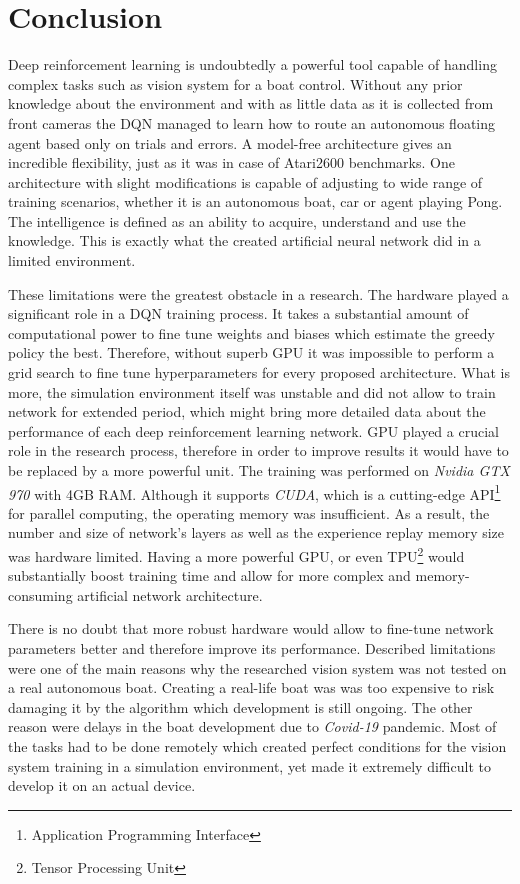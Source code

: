 \chapter{Conclusion}
\label{cha:conclusion}

Deep reinforcement learning is undoubtedly a powerful tool capable of handling complex tasks such as vision system for a boat control.
Without any prior knowledge about the environment and with as little data as it is collected from front cameras the DQN managed to
learn how to route an autonomous floating agent based only on trials and errors. A model-free architecture gives an incredible
flexibility, just as it was in case of Atari2600 benchmarks. One architecture with slight modifications is capable of adjusting to wide
range of training scenarios, whether it is an autonomous boat, car or agent playing Pong. The intelligence is defined as an ability to
acquire, understand and use the knowledge. This is exactly what the created artificial neural network did in a limited environment.

These limitations were the greatest obstacle in a research. The hardware played a significant role in a DQN training process. It takes a
substantial amount of computational power to fine tune weights and biases which estimate the greedy policy the best. Therefore, without
superb GPU it was impossible to perform a grid search to fine tune hyperparameters for every proposed architecture. What is more, the
simulation environment itself was unstable and did not allow to train network for extended period, which might bring more detailed data
about the performance of each deep reinforcement learning network. GPU played a crucial role in the research process, therefore in order
to improve results it would have to be replaced by a more powerful unit. The training was performed on \emph{Nvidia GTX 970} with 4GB RAM. Although it supports \emph{CUDA}, which is a cutting-edge API\footnote{Application Programming Interface} for parallel computing, the
operating memory was insufficient. As a result, the number and size of network's layers as well as the experience replay memory size was
hardware limited. Having a more powerful GPU, or even TPU\footnote{Tensor Processing Unit} would substantially boost training time and
allow for more complex and memory-consuming artificial network architecture.

There is no doubt that more robust hardware would allow to fine-tune network parameters better and therefore improve its performance. Described
limitations were one of the main reasons why the researched vision system was not tested on a real autonomous boat. Creating a real-life
boat was was too expensive to risk damaging it by the algorithm which development is still ongoing. The other reason were delays in the
boat development due to \emph{Covid-19} pandemic. Most of the tasks had to be done remotely which created perfect conditions for the vision system training in a simulation environment, yet made it extremely difficult to develop it on an actual device.

